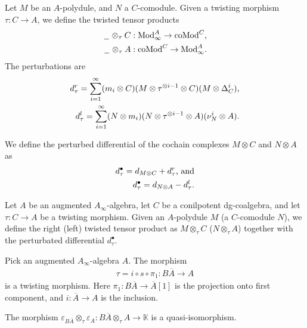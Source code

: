 \documentclass[../thesis.tex]{subfiles}
\begin{document}
            Let $M$ be an $A$-polydule, and $N$ a $C$-comodule. Given a twisting morphism $\tau : C \rightarrow A$, we define the twisted tensor products
            \begin{align*}
                \argument \otimes_\tau C & : \tt{Mod}_\infty^A \rightarrow \tt{coMod}^C\tt{,} \\
                \argument \otimes_\tau A & : \tt{coMod}^C \rightarrow \tt{Mod}_\infty^A\tt{.}
            \end{align*}
            The perturbations are
            \begin{align*}
                d_\tau^r = \sum_{i=1}^\infty (m_i \otimes C)(M \otimes \tau^{\otimes i-1} \otimes C)(M \otimes \Delta_C^i)\tt{,} \\
                d_\tau^l = \sum_{i=1}^\infty (N \otimes m_i) (N \otimes \tau^{\otimes i-1} \otimes A)(\nu_N^i \otimes A)\tt{.}
            \end{align*}

            We define the perturbed differential of the cochain complexes $M \otimes C$ and $N \otimes A$ as
            \begin{align*}
                d_\tau^\bullet = d_{M \otimes C} + d_\tau^r\tt{, and} \\
                d_\tau^\bullet = d_{N \otimes A} - d_\tau^l\tt{.}
            \end{align*}

            \begin{definition}
                Let $A$ be an augmented $A_\infty$-algebra, let $C$ be a conilpotent dg-coalgebra, and let $\tau: C \rightarrow A$ be a twisting morphism. Given an $A$-polydule $M$ (a $C$-comodule $N$), we define the right (left) twisted tensor product as $M \otimes_{\tau} C$ ($N \otimes_\tau A$) together with the perturbated differential $d_\tau^\bullet$.
            \end{definition}

            Pick an augmented $A_\infty$-algebra $A$. The morphism
            \begin{align*}
                \tau = i \circ s\circ \pi_1 : B\overline{A} \rightarrow A
            \end{align*}
            is a twisting morphism. Here $\pi_1 : B\overline{A} \rightarrow \overline{A}[1]$ is the projection onto first component, and $i : \overline{A} \rightarrow A$ is the inclusion.

            \begin{lemma}\label{lem: twisting-acyclic-v.2}
                The morphism $\varepsilon_{B\overline{A}}\otimes_\tau \varepsilon_A : B\overline{A} \otimes_\tau A \rightarrow \mathbb{K}$ is a quasi-isomorphism.
            \end{lemma}
\end{document}
